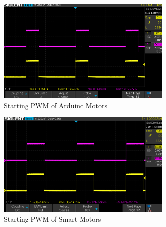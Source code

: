 \documentclass[conference]{IEEEtran}
\begin{document}
        \begin{figure}[htbp]
            \centering
            \includegraphics[keepaspectratio, height=2in]{figs/paper/bad_motors.png}
            \caption{Starting PWM of Arduino Motors}
            \label{fig:bad_motors}
        \end{figure}
        \begin{figure}[htbp]
            \centering
            \includegraphics[keepaspectratio, height=2in]{figs/paper/good_motors.png}
            \caption{Starting PWM of Smart Motors}
            \label{fig:good_motors}
        \end{figure}
\end{document}
